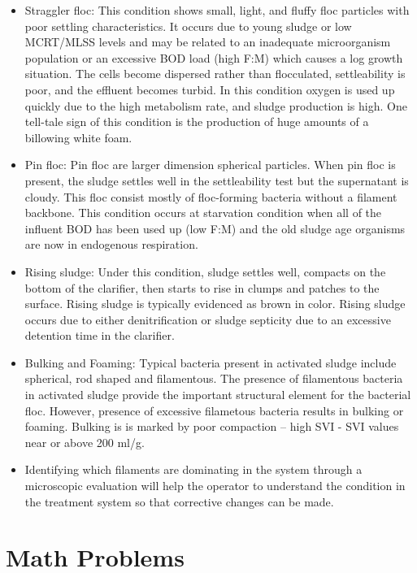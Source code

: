 \begin{itemize}
\item Straggler floc:  This condition shows small, light, and fluffy floc particles with poor settling characteristics. It occurs due to young sludge or low MCRT/MLSS levels and may be related to an inadequate microorganism population or an excessive BOD load (high F:M) which causes a log growth situation. The cells become dispersed rather than flocculated, settleability is poor, and the effluent becomes turbid. In this condition oxygen is used up quickly due to the high metabolism rate, and sludge production is high. One tell-tale sign of this condition is the production of huge amounts of a billowing white foam.

\item Pin floc:  Pin floc are larger dimension spherical particles.  When pin floc is present, the sludge settles well in the settleability test but the supernatant is cloudy. This floc consist mostly of floc-forming bacteria without a filament backbone.  This condition occurs at starvation condition when all of the influent BOD has been used up (low F:M) and the old sludge age organisms are now in endogenous respiration.

\item Rising sludge: Under this condition, sludge settles well, compacts on the bottom of the clarifier, then starts to rise in clumps and patches to the surface.  Rising sludge is typically evidenced as brown in color.  Rising sludge occurs due to either denitrification or sludge septicity due to an excessive detention time in the clarifier.  

\item Bulking and Foaming:  Typical bacteria present in activated sludge include spherical, rod shaped and filamentous.  The presence of filamentous bacteria in activated sludge provide the important structural element for the bacterial floc.  However, presence of excessive filametous bacteria results in bulking or foaming.  Bulking is is marked by poor compaction – high SVI - SVI values near or above 200 ml/g.
\item Identifying which filaments are dominating in the system through a microscopic evaluation will help the operator to understand the condition in the treatment system so that corrective changes can be made.\\
\end{itemize}


\section{Math Problems}


